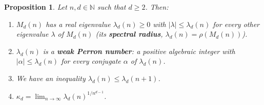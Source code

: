 \documentclass{article}
\theoremstyle{plain}
\newtheorem{lemma}[theorem]{Lemma}
\newtheorem{proposition}[theorem]{Proposition}
\theoremstyle{definition}
\theoremstyle{remark}
\begin{document}


\begin{proposition}\label{prop:Perron_Frob}
Let $n,d \in \mathbb{N}$ such that  $d\ge2$. Then:
\begin{enumerate}
    \item $M_d(n)$ has a real eigenvalue $\lambda_d(n)\ge0$ with $|\lambda| \le \lambda_d(n)$ for every other eigenvalue $\lambda$ of $M_d(n)$ (its \textbf{spectral radius}, $\lambda_d(n)=\rho(M_d(n))$).
    \item $\lambda_d(n)$ is a \textbf{weak Perron number}: a positive algebraic integer with $|\alpha|\le \lambda_d(n)$ for every conjugate $\alpha$ of $\lambda_d(n)$.
    \item We have an inequality $\lambda_d(n)\le\lambda_d(n+1)$.
    \item $\kappa_d = \lim_{n \to \infty} \lambda_d(n)^{1/n^{d-1}}$.
\end{enumerate}
\end{proposition}
\end{document}
